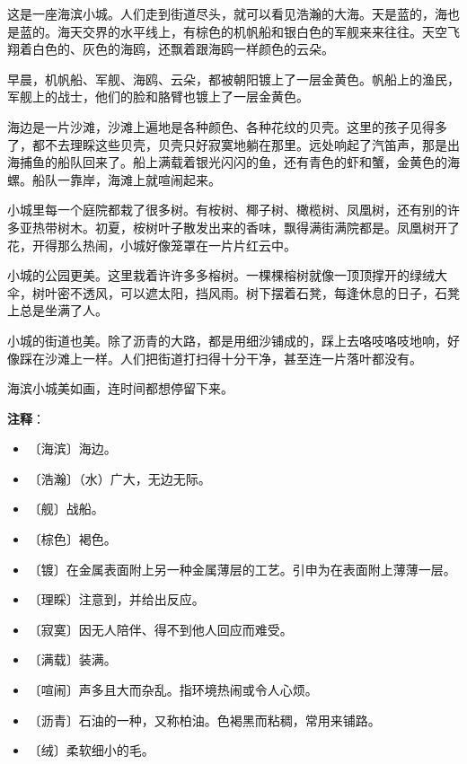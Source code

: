 \documentclass[12pt,UTF-8,openany]{ctexbook}
\begin{document}
\begin{Large}
    
    这是一座海滨小城。人们走到街道尽头，就可以看见浩瀚的大海。天是蓝的，海也是蓝的。海天交界的水平线上，有棕色的机帆船和银白色的军舰来来往往。天空飞翔着白色的、灰色的海鸥，还飘着跟海鸥一样颜色的云朵。
    
    早晨，机帆船、军舰、海鸥、云朵，都被朝阳镀上了一层金黄色。帆船上的渔民，军舰上的战士，他们的脸和胳臂也镀上了一层金黄色。
    
    海边是一片沙滩，沙滩上遍地是各种颜色、各种花纹的贝壳。这里的孩子见得多了，都不去理睬这些贝壳，贝壳只好寂寞地躺在那里。远处响起了汽笛声，那是出海捕鱼的船队回来了。船上满载着银光闪闪的鱼，还有青色的虾和蟹，金黄色的海螺。船队一靠岸，海滩上就喧闹起来。
    
    小城里每一个庭院都栽了很多树。有桉树、椰子树、橄榄树、凤凰树，还有别的许多亚热带树木。初夏，桉树叶子散发出来的香味，飘得满街满院都是。凤凰树开了花，开得那么热闹，小城好像笼罩在一片片红云中。
    
    小城的公园更美。这里栽着许许多多榕树。一棵棵榕树就像一顶顶撑开的绿绒大伞，树叶密不透风，可以遮太阳，挡风雨。树下摆着石凳，每逢休息的日子，石凳上总是坐满了人。
    
    小城的街道也美。除了沥青的大路，都是用细沙铺成的，踩上去咯吱咯吱地响，好像踩在沙滩上一样。人们把街道打扫得十分干净，甚至连一片落叶都没有。
    
    海滨小城美如画，连时间都想停留下来。
    
\end{Large}


\newpage

\textbf{注释}：

\vspace{-1em}

\begin{itemize}
    \setlength\itemsep{-0.2em}
    \item 〔海滨〕海边。
    \item 〔浩瀚〕（水）广大，无边无际。
    \item 〔舰〕战船。
    \item 〔棕色〕褐色。
    \item 〔镀〕在金属表面附上另一种金属薄层的工艺。引申为在表面附上薄薄一层。
    \item 〔理睬〕注意到，并给出反应。
    \item 〔寂寞〕因无人陪伴、得不到他人回应而难受。
    \item 〔满载〕装满。
    \item 〔喧闹〕声多且大而杂乱。指环境热闹或令人心烦。
    \item 〔沥青〕石油的一种，又称柏油。色褐黑而粘稠，常用来铺路。
    \item 〔绒〕柔软细小的毛。
\end{itemize}
\end{document}
